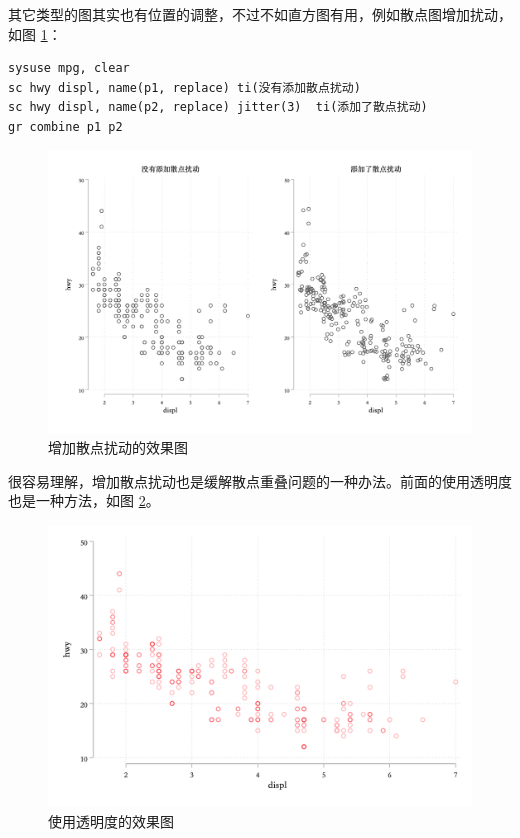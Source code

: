 其它类型的图其实也有位置的调整，不过不如直方图有用，例如散点图增加扰动，如图 \ref{fig:scjitter}：

\begin{lstlisting}
sysuse mpg, clear
sc hwy displ, name(p1, replace) ti(没有添加散点扰动)
sc hwy displ, name(p2, replace) jitter(3)  ti(添加了散点扰动)
gr combine p1 p2
\end{lstlisting}

\begin{figure}[htbp]
  \centering \includegraphics[width=\textwidth]{assets/scjitter.png}
  \caption{增加散点扰动的效果图}\label{fig:scjitter}
\end{figure}

很容易理解，增加散点扰动也是缓解散点重叠问题的一种办法。前面的使用透明度也是一种方法，如图 \ref{fig:scopc}。

\begin{figure}[htbp]
  \centering \includegraphics[width=\textwidth]{assets/scopc.png}
  \caption{使用透明度的效果图}\label{fig:scopc}
\end{figure}

